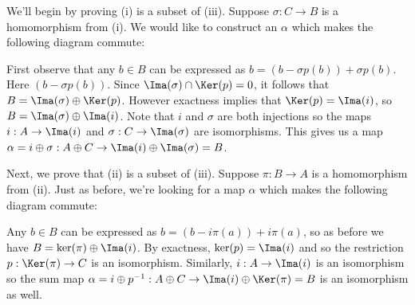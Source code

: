 \documentclass[11pt,letterpaper]{article}
\begin{document}
\begin{solution}
    We'll begin by proving (i) is a subset of (iii). Suppose $\sigma : C \to B$ is a homomorphism from (i). We would like to construct an $\alpha$ which makes the following diagram commute:
    \begin{center}
    \end{center} 
    First observe that any $b\in B$ can be expressed as $b=(b-\sigma p(b)) + \sigma p(b)$. Here $(b-\sigma p(b))$. Since $\Ima(\sigma)\cap \Ker(p)=0$, it follows that $B=\Ima(\sigma)\oplus \Ker(p)$. However exactness implies that $\Ker(p)=\Ima(i)$, so $B=\Ima(\sigma)\oplus \Ima(i)$. Note that $i$ and $\sigma$ are both injections so the maps $i : A \to \Ima(i)$ and $\sigma : C \to \Ima(\sigma)$ are isomorphisms. This gives us a map $\alpha = i\oplus \sigma : A\oplus C \to \Ima(i)\oplus \Ima(\sigma) = B$.

    Next, we prove that (ii) is a subset of (iii). Suppose $\pi : B \to A$ is a homomorphism from (ii). Just as before, we're looking for a map $\alpha$ which makes the following diagram commute:
    \begin{center}
    \end{center}
    Any $b\in B$ can be expressed as $b=(b-i\pi(a))+i\pi(a)$, so as before we have $B=\ker(\pi)\oplus \Ima(i)$. By exactness, $\ker(p)=\Ima(i)$ and so the restriction $p : \Ker(\pi)\to C$ is an isomorphism. Similarly, $i : A \to \Ima(i)$ is an isomorphism so the sum map $\alpha = i\oplus p^{-1} : A\oplus C \to \Ima(i)\oplus \Ker(\pi) = B$ is an isomorphism as well.


\end{solution}
\end{document}
